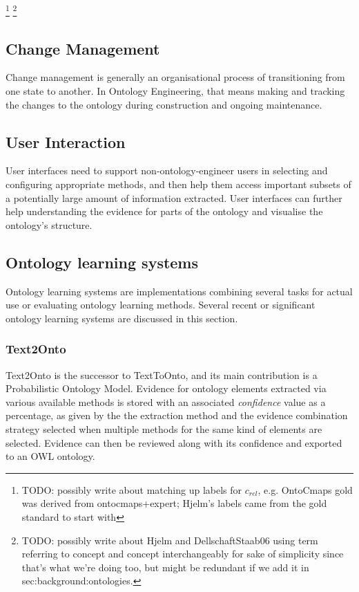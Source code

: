 \documentclass[a4paper]{report}
\newcommand{\todo}[1]{\footnote{{\color{red} TODO: #1}}}
\begin{document}
\todo{possibly write about matching up labels for \(c_{rel}\), e.g. OntoCmaps gold was derived from ontocmaps+expert; Hjelm's labels came from the gold standard to start with}
\todo{possibly write about Hjelm and DellschaftStaab06 using term referring to concept and concept interchangeably for sake of simplicity since that's what we're doing too, but might be redundant if we add it in sec:background:ontologies.}

\subsection{Change Management}

Change management is generally an organisational process of transitioning from one state to another.
In Ontology Engineering, that means making and tracking the changes to the ontology during construction and ongoing maintenance.

\subsection{User Interaction}

User interfaces need to support non-ontology-engineer users in selecting and configuring appropriate methods, and then help them access important subsets of a potentially large amount of information extracted.
User interfaces can further help understanding the evidence for parts of the ontology and visualise the ontology's structure.

\subsection{Ontology learning systems}

Ontology learning systems are implementations combining several tasks for actual use or evaluating ontology learning methods. Several recent or significant ontology learning systems are discussed in this section.

\subsubsection{Text2Onto}

Text2Onto is the successor to TextToOnto, and its main contribution is a Probabilistic Ontology Model.
Evidence for ontology elements extracted via various available methods is stored with an associated \emph{confidence} value as a percentage, as given by the the extraction method and the evidence combination strategy selected when multiple methods for the same kind of elements are selected.
Evidence can then be reviewed along with its confidence and exported to an OWL ontology.
\end{document}
